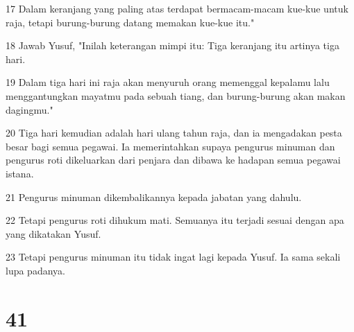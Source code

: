 \par 17 Dalam keranjang yang paling atas terdapat bermacam-macam kue-kue untuk raja, tetapi burung-burung datang memakan kue-kue itu."
\par 18 Jawab Yusuf, "Inilah keterangan mimpi itu: Tiga keranjang itu artinya tiga hari.
\par 19 Dalam tiga hari ini raja akan menyuruh orang memenggal kepalamu lalu menggantungkan mayatmu pada sebuah tiang, dan burung-burung akan makan dagingmu."
\par 20 Tiga hari kemudian adalah hari ulang tahun raja, dan ia mengadakan pesta besar bagi semua pegawai. Ia memerintahkan supaya pengurus minuman dan pengurus roti dikeluarkan dari penjara dan dibawa ke hadapan semua pegawai istana.
\par 21 Pengurus minuman dikembalikannya kepada jabatan yang dahulu.
\par 22 Tetapi pengurus roti dihukum mati. Semuanya itu terjadi sesuai dengan apa yang dikatakan Yusuf.
\par 23 Tetapi pengurus minuman itu tidak ingat lagi kepada Yusuf. Ia sama sekali lupa padanya.

\chapter{41}

